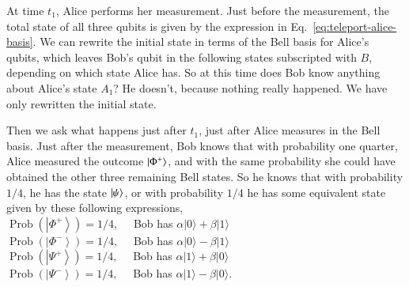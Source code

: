 At time $t_1$, Alice performs her measurement. Just before the measurement, the total state of all three qubits is given by the expression in Eq.~\ref{eq:teleport-alice-basis}. We can rewrite the initial state in terms of the Bell basis for Alice's qubits, which leaves Bob's qubit in the following states subscripted with $B$, depending on which state Alice has. So at this time does Bob know anything about Alice's state $A_1$? He doesn't, because nothing really happened. We have only rewritten the initial state.

Then we ask what happens just after $t_1$, just after Alice measures in the Bell basis. Just after the measurement, Bob knows that with probability one quarter, Alice measured the outcome $\left| \Phi^+ \right\rangle$, and with the same probability she could have obtained the other three remaining Bell states. So he knows that with probability $1/4$, he has the state $\left| \psi \right\rangle$, or with probability $1/4$ he has some equivalent state given by these following expressions,\\
$\operatorname{Prob}\left(\left|\Phi^{+}\right\rangle\right)=1 / 4, \quad$ Bob has $\alpha|0\rangle+\beta|1\rangle$\\
$\operatorname{Prob}\left(\left|\Phi^{-}\right\rangle\right)=1 / 4, \quad$ Bob has $\alpha|0\rangle-\beta|1\rangle$\\
$\operatorname{Prob}\left(\left|\Psi^{+}\right\rangle\right)=1 / 4, \quad$ Bob has $\alpha|1\rangle+\beta|0\rangle$\\
$\operatorname{Prob}\left(\left|\Psi^{-}\right\rangle\right)=1 / 4, \quad$ Bob has $\alpha|1\rangle-\beta|0\rangle$.\\

